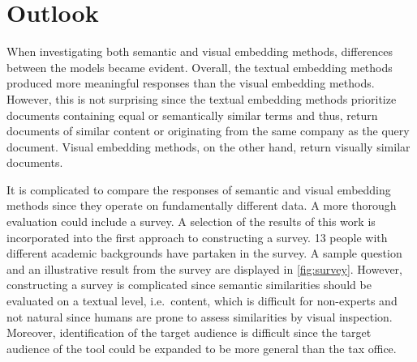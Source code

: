 \chapter{Outlook}\label{ch:outlook}

When investigating both semantic and visual embedding methods, differences between the models became evident.
Overall, the textual embedding methods produced more meaningful responses than the visual embedding methods.
However, this is not surprising since the textual embedding methods prioritize documents containing equal or semantically similar terms and thus,
return documents of similar content or originating from the same company as the query document.
Visual embedding methods, on the other hand, return visually similar documents.

It is complicated to compare the responses of semantic and visual embedding methods since they operate on fundamentally different data.
A more thorough evaluation could include a survey.
A selection of the results of this work is incorporated into the first approach to constructing a survey.
13 people with different academic backgrounds have partaken in the survey.
A sample question and an illustrative result from the survey are displayed in \autoref{fig:survey}.
However, constructing a survey is complicated since semantic similarities should be evaluated on a textual level, i.e.\ content, 
which is difficult for non-experts and not natural since humans are prone to assess similarities by visual inspection.
Moreover, identification of the target audience is difficult since the target audience of the tool could be expanded to be more general than the tax office.

